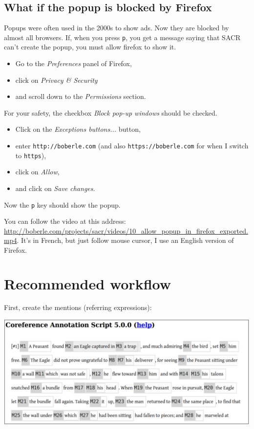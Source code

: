\documentclass[12pt]{article}
\begin{document}
 \subsection{What if the popup is blocked by Firefox}

Popups were often used in the 2000s to show ads.  Now they are blocked by
almost all browsers.  If, when you press \verb|p|, you get a message saying
that SACR can't create the popup, you must allow firefox to show it.

\begin{itemize}
   \item Go to the \emph{Preferences} panel of Firefox,
   \item click on \emph{Privacy \& Security}
   \item and scroll down to the \emph{Permissions} section.
\end{itemize}

For your safety, the checkbox \emph{Block pop-up windows} should be checked.

\begin{itemize}
   \item Click on the \emph{Exceptions buttons...} button,
   \item enter \verb|http://boberle.com| (and also \verb|https://boberle.com|
   for when I switch to \verb|https|),
   \item click on \emph{Allow},
   \item and click on \emph{Save changes}.
\end{itemize}

Now the \verb|p| key should show the popup.

You can follow the video at this address:
\url{http://boberle.com/projects/sacr/videos/10_allow_popup_in_firefox_exported.mp4}.
It's in French, but just follow mouse cursor, I use an English version of
Firefox.


 \section{Recommended workflow}

First, create the mentions (referring expressions):\nopagebreak

\includegraphics[width=15cm]{imgs/workflow1.png}
\end{document}
